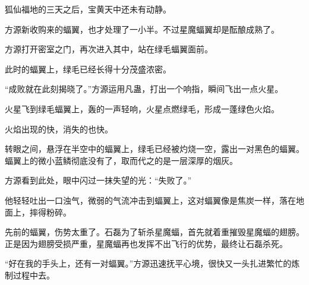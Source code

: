 \begin{this_body}
狐仙福地的三天之后，宝黄天中还未有动静。

方源新收购来的蝠翼，也才处理了一小半。不过星魔蝠翼却是酝酿成熟了。

方源打开密室之门，再次进入其中，站在绿毛蝠翼面前。

此时的蝠翼上，绿毛已经长得十分茂盛浓密。

“成败就在此刻揭晓了。”方源运用凡蛊，打出一个响指，瞬间飞出一点火星。

火星飞到绿毛蝠翼上，轰的一声轻响，火星点燃绿毛，形成一蓬绿色火焰。

火焰出现的快，消失的也快。

转眼之间，悬浮在半空中的蝠翼上，绿毛已经被灼烧一空，露出一对黑色的蝠翼。蝠翼上的微小蓝鳞彻底没有了，取而代之的是一层深厚的烟灰。

方源看到此处，眼中闪过一抹失望的光：“失败了。”

他轻轻吐出一口浊气，微弱的气流冲击到蝠翼上，这对蝠翼像是焦炭一样，落在地面上，摔得粉碎。

先前的蝠翼，伤势太重了。石磊为了斩杀星魔蝠，首先就着重摧毁星魔蝠的翅膀。正是因为翅膀受损严重，星魔蝠再也发挥不出飞行的优势，最终让石磊杀死。

“好在我的手头上，还有一对蝠翼。”方源迅速抚平心境，很快又一头扎进繁忙的炼制过程中去。

\end{this_body}

